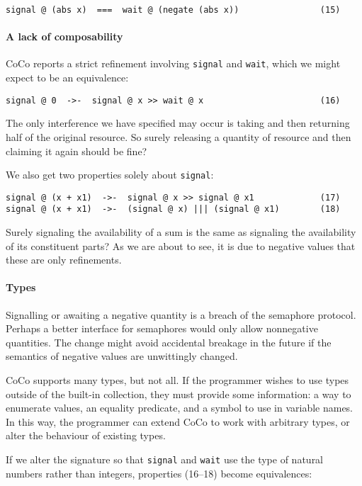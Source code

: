 \begin{verbatim}
signal @ (abs x)  ===  wait @ (negate (abs x))                (15)
\end{verbatim}

\paragraph{A lack of composability}
CoCo reports a strict refinement involving \verb|signal| and
\verb|wait|, which we might expect to be an equivalence:

\begin{verbatim}
signal @ 0  ->-  signal @ x >> wait @ x                       (16)
\end{verbatim}

\noindent
The only interference we have specified may occur is taking and then
returning half of the original resource.  So surely releasing a
quantity of resource and then claiming it again should be fine?

We also get two properties solely about \verb|signal|:

\begin{verbatim}
signal @ (x + x1)  ->-  signal @ x >> signal @ x1             (17)
signal @ (x + x1)  ->-  (signal @ x) ||| (signal @ x1)        (18)
\end{verbatim}

\noindent
Surely signaling the availability of a sum is the same as signaling
the availability of its constituent parts?  As we are about to see, it
is due to negative values that these are only refinements.

\paragraph{Types}
Signalling or awaiting a negative quantity is a breach of the
semaphore protocol.  Perhaps a better interface for semaphores would
only allow nonnegative quantities.  The change might avoid accidental
breakage in the future if the semantics of negative values are
unwittingly changed.

CoCo supports many types, but not all.  If the programmer wishes to
use types outside of the built-in collection, they must provide some
information: a way to enumerate values, an equality predicate, and a
symbol to use in variable names.  In this way, the programmer can
extend CoCo to work with arbitrary types, or alter the behaviour of
existing types.

If we alter the signature so that \verb|signal| and \verb|wait| use
the type of natural numbers rather than integers, properties (16--18)
become equivalences:

